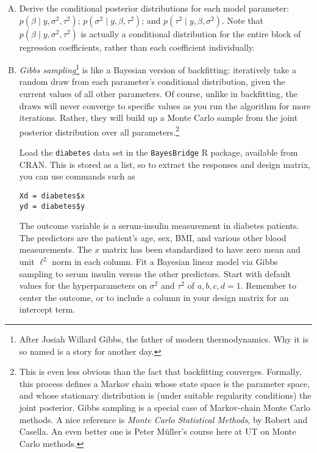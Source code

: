 \documentclass{mynotes}
\begin{document}
\begin{enumerate}[(A)]
\item Derive the conditional posterior distributions for each model parameter: $p(\beta \mid y, \sigma^2, \tau^2)$; $p(\sigma^2 \mid y, \beta, \tau^2)$; and $p(\tau^2 \mid y, \beta, \sigma^2)$.  Note that $p(\beta \mid y, \sigma^2, \tau^2)$ is actually a conditional distribution for the entire block of regression coefficients, rather than each coefficient individually.
\item \textit{Gibbs sampling}\footnote{After Josiah Willard Gibbs, the father of modern thermodynamics.  Why it is so named is a story for another day.} is like a Bayesian version of backfitting: iteratively take a random draw from each parameter's conditional distribution, given the current values of all other parameters.  Of course, unlike in backfitting, the draws will never converge to specific values as you run the algorithm for more iterations.  Rather, they will build up a Monte Carlo sample from the joint posterior distribution over all parameters.\footnote[][-4pc]{This is even less obvious than the fact that backfitting converges.  Formally, this process defines a Markov chain whose state space is the parameter space, and whose stationary distribution is (under suitable regularity conditions) the joint posterior.  Gibbs sampling is a special case of Markov-chain Monte Carlo methods. A nice reference is \textit{Monte Carlo Statistical Methods}, by Robert and Casella.  An even better one is Peter M\"uller's course here at UT on Monte Carlo methods.}

Load the \verb|diabetes| data set in the \verb|BayesBridge| R package, available from CRAN.  This is stored as a list, so to extract the responses and design matrix, you can use commands such as
\begin{verbatim}
Xd = diabetes$x
yd = diabetes$y
\end{verbatim}
The outcome variable is a serum-insulin measurement in diabetes patients.  The predictors are the patient's age, sex, BMI, and various other blood measurements. The $x$ matrix has been standardized to have zero mean and unit $\ell^2$ norm in each column.  Fit a Bayesian linear model via Gibbs sampling to serum insulin versus the other predictors.  Start with default values for the hyperparameters on $\sigma^2$ and $\tau^2$ of $a,b,c,d=1$. Remember to center the outcome, or to include a column in your design matrix for an intercept term.

\end{enumerate}
\end{document}
